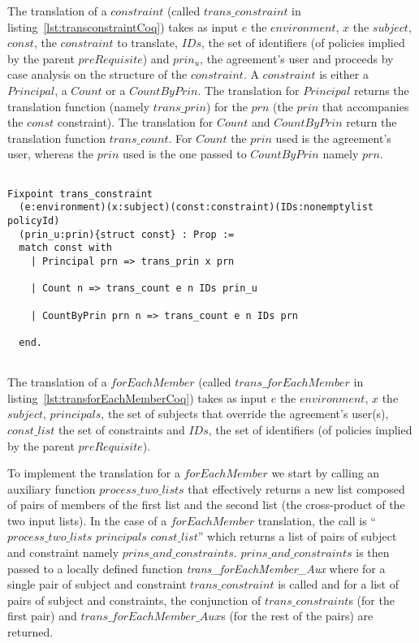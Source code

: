 The translation of a $constraint$ (called $trans\_constraint$ in listing~\ref{lst:transconstraintCoq}) takes as input $e$ the $environment$, $x$ the $subject$, $const$, the $constraint$ to translate, $IDs$, the set of identifiers (of policies implied by the parent $preRequisite$) and $prin_{u}$, the agreement's user and proceeds by case analysis on the structure of the $constraint$. A $constraint$ is either a $Principal$, a $Count$ or a $CountByPrin$. The translation for $Principal$ returns the translation function (namely $trans\_prin$) for the $prn$ (the $prin$ that accompanies the $const$ constraint). The translation for $Count$ and $CountByPrin$ return the translation function $trans\_count$. For $Count$ the $prin$ used is the agreement's user, whereas the $prin$ used is the one passed to $CountByPrin$ namely $prn$.


\begin{lstlisting}

Fixpoint trans_constraint 
  (e:environment)(x:subject)(const:constraint)(IDs:nonemptylist policyId)
  (prin_u:prin){struct const} : Prop := 
  match const with
    | Principal prn => trans_prin x prn
  
    | Count n => trans_count e n IDs prin_u 

    | CountByPrin prn n => trans_count e n IDs prn 

  end.
  
\end{lstlisting}

The translation of a $forEachMember$ (called $trans\_forEachMember$ in listing~\ref{lst:transforEachMemberCoq}) takes as input $e$ the $environment$, $x$ the $subject$, $principals$, the set of subjects that override the agreement's user(s), $const\_list$ the set of constraints and $IDs$, the set of identifiers (of policies implied by the parent $preRequisite$).

To implement the translation for a $forEachMember$ we start by calling an auxiliary function $process\_two\_lists$ that effectively returns a new list composed of pairs of members of the first list and the second list (the cross-product of the two input lists). In the case of a $forEachMember$ translation, the call is ``$process\_two\_lists$ $principals$ $const\_list$'' which returns a list of pairs of subject and constraint namely $prins\_and\_constraints$. $prins\_and\_constraints$ is then passed to a locally defined function \emph{ trans_forEachMember_Aux} where for a single pair of subject and constraint $trans\_constraint$ is called and for a list of pairs of subject and constraints, the conjunction of $trans\_constraint$s (for the first pair) and $trans\_forEachMember\_Aux$s (for the rest of the pairs) are returned.



